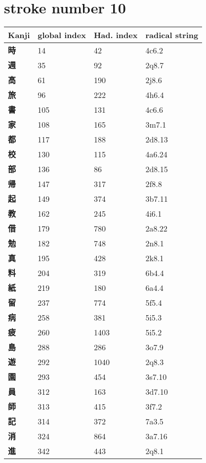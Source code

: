 \section{stroke number 10}
  \begin{longtable}[c]{llll}
    \bfseries Kanji & \bfseries global index & \bfseries Had. index & \bfseries radical string\\\hline\endhead
    \bfseries 時 & 14 & 42 & 4c6.2\\
    \bfseries 週 & 35 & 92 & 2q8.7\\
    \bfseries 高 & 61 & 190 & 2j8.6\\
    \bfseries 旅 & 96 & 222 & 4h6.4\\
    \bfseries 書 & 105 & 131 & 4c6.6\\
    \bfseries 家 & 108 & 165 & 3m7.1\\
    \bfseries 都 & 117 & 188 & 2d8.13\\
    \bfseries 校 & 130 & 115 & 4a6.24\\
    \bfseries 部 & 136 & 86 & 2d8.15\\
    \bfseries 帰 & 147 & 317 & 2f8.8\\
    \bfseries 起 & 149 & 374 & 3b7.11\\
    \bfseries 教 & 162 & 245 & 4i6.1\\
    \bfseries 借 & 179 & 780 & 2a8.22\\
    \bfseries 勉 & 182 & 748 & 2n8.1\\
    \bfseries 真 & 195 & 428 & 2k8.1\\
    \bfseries 料 & 204 & 319 & 6b4.4\\
    \bfseries 紙 & 219 & 180 & 6a4.4\\
    \bfseries 留 & 237 & 774 & 5f5.4\\
    \bfseries 病 & 258 & 381 & 5i5.3\\
    \bfseries 疲 & 260 & 1403 & 5i5.2\\
    \bfseries 島 & 288 & 286 & 3o7.9\\
    \bfseries 遊 & 292 & 1040 & 2q8.3\\
    \bfseries 園 & 293 & 454 & 3s7.10\\
    \bfseries 員 & 312 & 163 & 3d7.10\\
    \bfseries 師 & 313 & 415 & 3f7.2\\
    \bfseries 記 & 314 & 372 & 7a3.5\\
    \bfseries 消 & 324 & 864 & 3a7.16\\
    \bfseries 進 & 342 & 443 & 2q8.1\\

\end{longtable}
